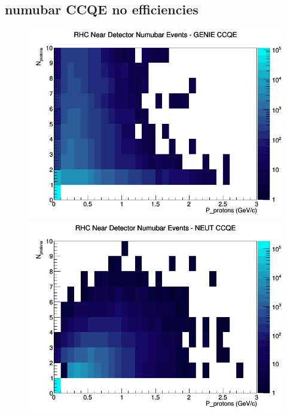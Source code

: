 \subsection{numubar CCQE no efficiencies}
\begin{figure}[h]
\includegraphics[width=\linewidth]{N_P/nominal/protons/CCQE_RHC_ND_numubar_N_P_GENIE.png}
\endminipage
{}
\includegraphics[width=\linewidth]{N_P/nominal/protons/CCQE_RHC_ND_numubar_N_P_NEUT.png}
\endminipage
{}

\end{figure}
